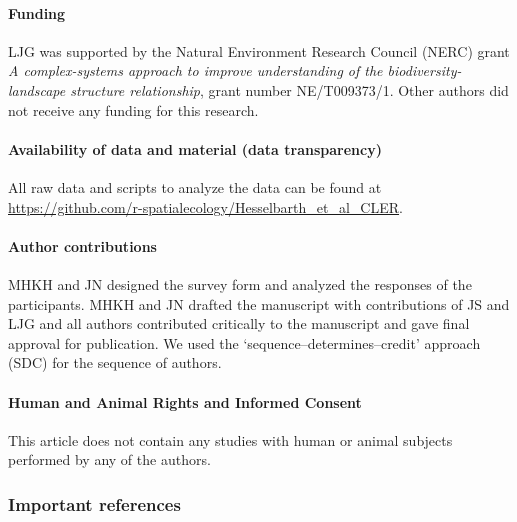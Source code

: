 \documentclass[smallextended]{svjour3}       %
\begin{document}
\hypertarget{funding}{%
\paragraph{Funding}\label{funding}}

LJG was supported by the Natural Environment Research Council (NERC) grant \textit{A complex-systems approach to improve understanding of the biodiversity-landscape structure relationship}, grant number NE/T009373/1.
Other authors did not receive any funding for this research.

\hypertarget{availability-of-data-and-material-data-transparency}{%
\paragraph{Availability of data and material (data transparency)}\label{availability-of-data-and-material-data-transparency}}

All raw data and scripts to analyze the data can be found at \url{https://github.com/r-spatialecology/Hesselbarth_et_al_CLER}.

\hypertarget{author-contributions}{%
\paragraph{Author contributions}\label{author-contributions}}

MHKH and JN designed the survey form and analyzed the responses of the participants.
MHKH and JN drafted the manuscript with contributions of JS and LJG and all authors contributed critically to the manuscript and gave final approval for publication.
We used the `sequence--determines--credit' approach (SDC) for the sequence of authors.

\hypertarget{human-and-animal-rights-and-informed-consent}{%
\paragraph{Human and Animal Rights and Informed Consent}\label{human-and-animal-rights-and-informed-consent}}

This article does not contain any studies with human or animal subjects performed by any of the authors.

\hypertarget{important-references}{%
\subsubsection{Important references}\label{important-references}}
\end{document}
